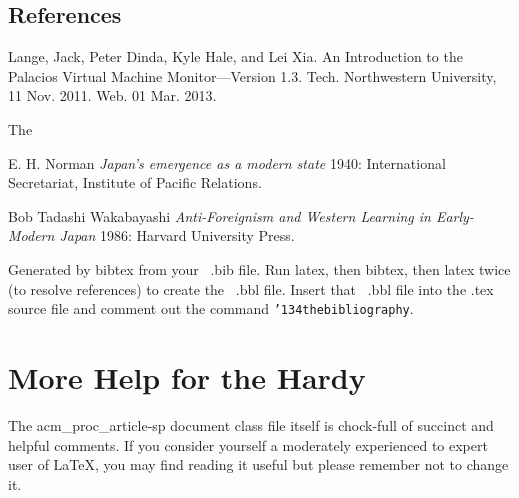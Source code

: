 \documentclass{acm_proc_article-sp}
\begin{document}
\subsection{References}
\begin{thebibliography}{1}

   Lange, Jack, Peter Dinda, Kyle Hale, and Lei Xia. An Introduction to the Palacios Virtual Machine Monitor---Version 1.3. Tech. Northwestern University, 11 Nov. 2011. Web. 01 Mar. 2013.

    The 

   E. H. Norman {\em Japan's emergence as a modern
  state} 1940: International Secretariat, Institute of Pacific
  Relations.

   Bob Tadashi Wakabayashi {\em Anti-Foreignism and Western
  Learning in Early-Modern Japan} 1986: Harvard University Press.

  \end{thebibliography}
Generated by bibtex from your ~.bib file.  Run latex,
then bibtex, then latex twice (to resolve references)
to create the ~.bbl file.  Insert that ~.bbl file into
the .tex source file and comment out
the command \texttt{{\char'134}thebibliography}.
\section{More Help for the Hardy}
The acm\_proc\_article-sp document class file itself is chock-full of succinct
and helpful comments.  If you consider yourself a moderately
experienced to expert user of \LaTeX, you may find reading
it useful but please remember not to change it.
\balancecolumns
\end{document}
